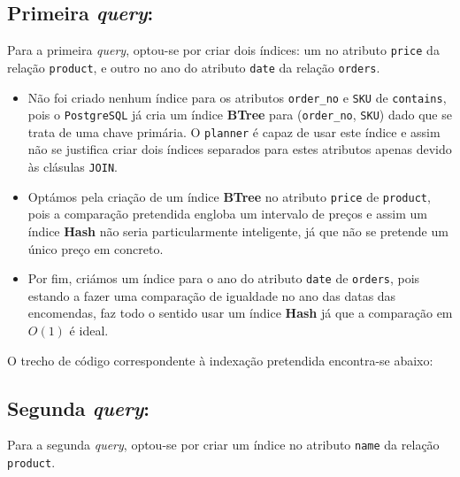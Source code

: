 \documentclass[12pt,a4paper]{article}
\begin{document}
\subsection*{Primeira \textit{query}:}



Para a primeira \textit{query}, optou-se por criar dois índices: um no atributo
\texttt{price} da relação \texttt{product}, e outro no ano do atributo \texttt{date}
da relação \texttt{orders}.

\vspace*{0.25cm}

\begin{itemize}
  \item Não foi criado nenhum índice para os atributos \texttt{order\_no} e \texttt{SKU} de \texttt{contains}, pois o
        \texttt{PostgreSQL} já cria um índice \textbf{BTree} para (\texttt{order\_no}, \texttt{SKU}) dado que se trata
        de uma chave primária.
        O \texttt{planner} é capaz de usar este índice e assim não se justifica criar dois
        índices separados para estes atributos apenas devido às clásulas \texttt{JOIN}.

  \item Optámos pela criação de um índice \textbf{BTree} no atributo \texttt{price} de \texttt{product}, pois
        a comparação pretendida engloba um intervalo de preços e assim um índice \textbf{Hash}
        não seria particularmente inteligente, já que não se pretende um único preço
        em concreto.

  \item Por fim, criámos um índice para o ano do atributo \texttt{date} de \texttt{orders}, pois
        estando a fazer uma comparação de igualdade no ano das datas das encomendas,
        faz todo o sentido usar um índice \textbf{Hash} já que a comparação em $O(1)$ é ideal.
\end{itemize}

O trecho de código correspondente à indexação pretendida encontra-se abaixo:



\subsection*{Segunda \textit{query}:}



Para a segunda \textit{query}, optou-se por criar um índice no atributo \texttt{name} da relação
\texttt{product}.
\end{document}
